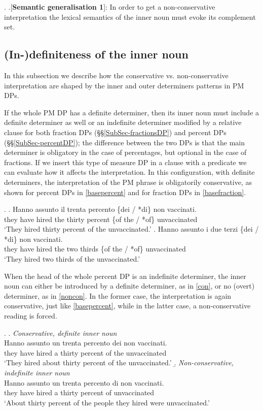 \documentclass[charis, linguex]{glossa}
\begin{document}
\ex. \label{semgen1} \a.[{\bf Semantic generalisation 1}]: In order to get a non-conservative interpretation the lexical semantics of the inner noun must evoke its complement set.

\subsection{(In-)definiteness of the inner noun} \label{SubSec-Definiteness}

In this subsection we describe how the conservative vs. non-conservative interpretation are shaped by the inner and outer determiners patterns in PM DPs. 

 
If the whole PM DP has a definite determiner, then its inner noun must include a definite determiner as well or an indefinite determiner modified by a relative clause for both fraction DPs (\S\S\ref{SubSec-fractionsDP}) and percent DPs (\S\S\ref{SubSec-percentDP}); the difference between the two DPs is that the main determiner is obligatory in the case of percentages, but optional in the case of fractions. If we insert this type of measure DP in a clause with a predicate we can evaluate how it affects the interpretation. In this configuration, with definite determiners, the interpretation of the PM phrase is obligatorily conservative, as shown for percent DPs in \ref{basepercent} and for fraction DPs in \ref{basefraction}.

\ex. \ag. Hanno assunto il trenta percento \{dei / *di\} {non vaccinati}. \\
	  {they have} hired the thirty percent \{{of the} / *of\} unvaccinated \\	
 \glt `They hired thirty percent of the unvaccinated.'  \label{basepercent}
\bg.  Hanno assunto i due terzi \{dei / *di\} {non vaccinati}. \\
 	  {they have} hired the two thirds \{{of the} / *of\} unvaccinated \\	
  \glt `They hired two thirds of the unvaccinated.'   \label{basefraction}
 
 
When the head of the whole percent DP is an indefinite determiner, the inner noun can either be introduced by a definite determiner, as in \ref{con}, or no (overt) determiner, as in \ref{noncon}. In the former case, the interpretation is again conservative, just like \ref{basepercent}, while in the latter case, a non-conservative reading is forced.

\ex. \a. \textit{Conservative, definite inner noun} \\
     \gll Hanno assunto un trenta percento dei {non vaccinati}.\\ 
	      {they have} hired a thirty percent {of the} unvaccinated\\
	\glt `They hired about thirty percent of the unvaccinated.' 	\label{con} 
	\b. \textit{Non-conservative, indefinite inner noun} \\
	 \gll  Hanno assunto un trenta percento di {non vaccinati}.\\
	     {they have} hired a thirty percent of unvaccinated \\ 
	\glt `About thirty percent of the people they hired were unvaccinated.' \label{noncon}	
\end{document}
